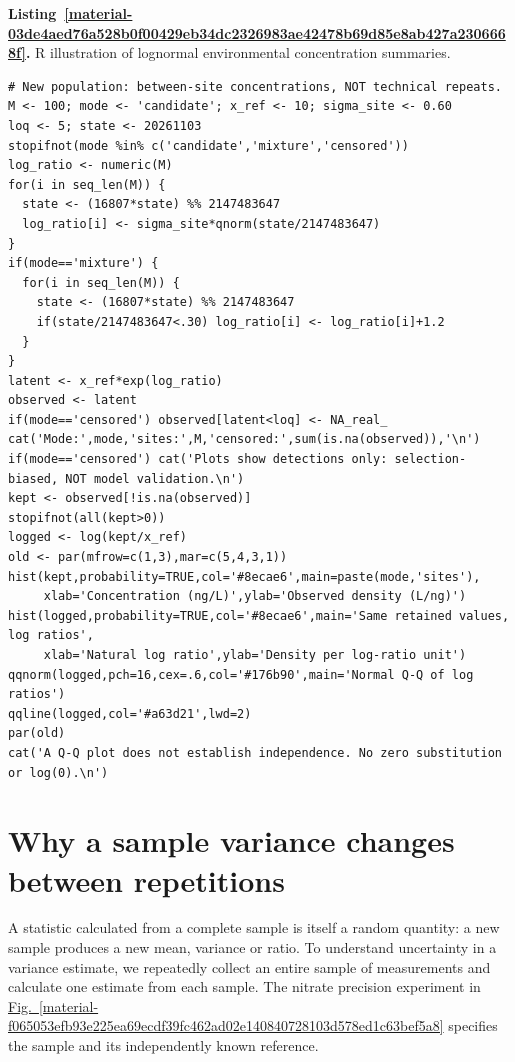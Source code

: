 \documentclass[11pt,a4paper]{article}
\newcounter{listing}
\begin{document}
\par\medskip
{}
\label{material-03de4aed76a528b0f00429eb34dc2326983ae42478b69d85e8ab427a2306668f}
\noindent\textbf{Listing~\ref*{material-03de4aed76a528b0f00429eb34dc2326983ae42478b69d85e8ab427a2306668f}.} R illustration of lognormal environmental concentration summaries.\par\nopagebreak
\begin{Verbatim}[fontsize=\footnotesize,breaklines=true,breakanywhere=true]
# New population: between-site concentrations, NOT technical repeats.
M <- 100; mode <- 'candidate'; x_ref <- 10; sigma_site <- 0.60
loq <- 5; state <- 20261103
stopifnot(mode %in% c('candidate','mixture','censored'))
log_ratio <- numeric(M)
for(i in seq_len(M)) {
  state <- (16807*state) %% 2147483647
  log_ratio[i] <- sigma_site*qnorm(state/2147483647)
}
if(mode=='mixture') {
  for(i in seq_len(M)) {
    state <- (16807*state) %% 2147483647
    if(state/2147483647<.30) log_ratio[i] <- log_ratio[i]+1.2
  }
}
latent <- x_ref*exp(log_ratio)
observed <- latent
if(mode=='censored') observed[latent<loq] <- NA_real_
cat('Mode:',mode,'sites:',M,'censored:',sum(is.na(observed)),'\n')
if(mode=='censored') cat('Plots show detections only: selection-biased, NOT model validation.\n')
kept <- observed[!is.na(observed)]
stopifnot(all(kept>0))
logged <- log(kept/x_ref)
old <- par(mfrow=c(1,3),mar=c(5,4,3,1))
hist(kept,probability=TRUE,col='#8ecae6',main=paste(mode,'sites'),
     xlab='Concentration (ng/L)',ylab='Observed density (L/ng)')
hist(logged,probability=TRUE,col='#8ecae6',main='Same retained values, log ratios',
     xlab='Natural log ratio',ylab='Density per log-ratio unit')
qqnorm(logged,pch=16,cex=.6,col='#176b90',main='Normal Q-Q of log ratios')
qqline(logged,col='#a63d21',lwd=2)
par(old)
cat('A Q-Q plot does not establish independence. No zero substitution or log(0).\n')

\end{Verbatim}

\medskip

\clearpage
\section{Why a sample variance changes between repetitions}
A statistic calculated from a complete sample is itself a random quantity: a new sample produces a new mean, variance or ratio. To understand uncertainty in a variance estimate, we repeatedly collect an entire sample of measurements and calculate one estimate from each sample. The nitrate precision experiment in \hyperref[material-f065053efb93e225ea69ecdf39fc462ad02e140840728103d578ed1c63bef5a8]{Fig.~\ref*{material-f065053efb93e225ea69ecdf39fc462ad02e140840728103d578ed1c63bef5a8}} specifies the sample and its independently known reference.
\end{document}
